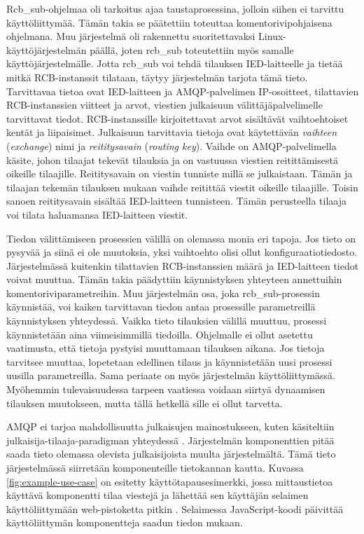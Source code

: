 Rcb\_sub-ohjelmaa oli tarkoitus ajaa taustaprosessina, jolloin siihen ei tarvittu käyttöliittymää. Tämän takia se päätettiin toteuttaa komentorivipohjaisena ohjelmana. Muu järjestelmä oli rakennettu suoritettavaksi Linux-käyttöjärjestelmän päällä, joten rcb\_sub toteutettiin myös samalle käyttöjärjestelmälle. Jotta rcb\_sub voi tehdä tilauksen IED-laitteelle ja tietää mitkä RCB-instanssit tilataan, täytyy järjestelmän tarjota tämä tieto. Tarvittavaa tietoa ovat IED-laitteen ja AMQP-palvelimen IP-osoitteet, tilattavien RCB-instanssien viitteet ja arvot, viestien julkaisuun välittäjäpalvelimelle tarvittavat tiedot. RCB-instanssille kirjoitettavat arvot sisältävät vaihtoehtoiset kentät ja liipaisimet. Julkaisuun tarvittavia tietoja ovat käytettävän \emph{vaihteen} (\emph{exchange}) nimi ja \emph{reititysavain} (\emph{routing key}). Vaihde on AMQP-palvelimella käsite, johon tilaajat tekevät tilauksia ja on vastuussa viestien reitittämisestä oikeille tilaajille. Reititysavain on viestin tunniste millä se julkaistaan. Tämän ja tilaajan tekemän tilauksen mukaan vaihde reitittää viestit oikeille tilaajille. Toisin sanoen reititysavain sisältää IED-laitteen tunnisteen. Tämän perusteella tilaaja voi tilata haluamansa IED-laitteen viestit.

Tiedon välittämiseen prosessien välillä on olemassa monia eri tapoja. Jos tieto on pysyvää ja siinä ei ole muutoksia, yksi vaihtoehto olisi ollut konfiguraatiotiedosto. Järjestelmässä kuitenkin tilattavien RCB-instanssien määrä ja IED-laitteen tiedot voivat muuttua. Tämän takia päädyttiin käynnistyksen yhteyteen annettuihin komentoriviparametreihin. Muu järjestelmän osa, joka rcb\_sub-prosessin käynnistää, voi kaiken tarvittavan tiedon antaa prosessille parametreillä käynnistyksen yhteydessä. Vaikka tieto tilauksien välillä muuttuu, prosessi käynnistetään aina viimeisimmillä tiedoilla. Ohjelmalle ei ollut asetettu vaatimusta, että tietoja pystyisi muuttamaan tilauksen aikana. Jos tietoja tarvitsee muuttaa, lopetetaan edellinen tilaus ja käynnistetään uusi prosessi uusilla parametreilla. Sama periaate on myös järjestelmän käyttöliittymässä. Myöhemmin tulevaisuudessa tarpeen vaatiessa voidaan siirtyä dynaamisen tilauksen muutokseen, mutta tällä hetkellä sille ei ollut tarvetta.

AMQP ei tarjoa mahdollisuutta julkaisujen mainostukseen, kuten käsiteltiin julkaisija-tilaaja-paradigman yhteydessä \cite{AMQP-specification}. Järjestelmän komponenttien pitää saada tieto olemassa olevista julkaisijoista muulta järjestelmältä. Tämä tieto järjestelmässä siirretään komponenteille tietokannan kautta. Kuvassa \ref{fig:example-use-case} on esitetty käyttötapausesimerkki, jossa mittaustietoa käyttävä komponentti tilaa viestejä ja lähettää sen käyttäjän selaimen käyttöliittymään web-pistoketta pitkin \cite{websocket}. Selaimessa JavaScript-koodi päivittää käyttöliittymän komponentteja saadun tiedon mukaan.

